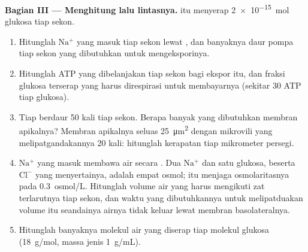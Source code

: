 \begin{problem}
\medskip
\noindent\textbf{Bagian III --- Menghitung lalu lintasnya.}
 itu menyerap \qty{2e-15}{mol} glukosa tiap sekon.
\begin{enumerate}[resume]
  \item Hitunglah $\mathrm{Na^+}$ yang masuk tiap sekon lewat
        , dan banyaknya daur pompa tiap sekon yang
        dibutuhkan untuk mengeksporinya.
  \item Hitunglah ATP yang dibelanjakan tiap sekon bagi ekspor itu, dan
        fraksi glukosa terserap yang harus direspirasi untuk
        membayarnya (sekitar 30 ATP tiap glukosa).
  \item Tiap  berdaur \qty{50}{} kali tiap sekon. Berapa
        banyak  yang dibutuhkan membran apikalnya? Membran
        apikalnya seluas \qty{25}{\micro m^2} dengan mikrovili yang
        melipatgandakannya \qty{20}{} kali: hitunglah kerapatan
         tiap mikrometer persegi.
  \item $\mathrm{Na^+}$ yang masuk membawa air secara . Dua
        $\mathrm{Na^+}$ dan satu glukosa, beserta $\mathrm{Cl^-}$ yang
        menyertainya, adalah empat osmol;  itu menjaga
        osmolaritasnya pada \qty{0.3}{osmol/L}. Hitunglah volume air
        yang harus mengikuti zat terlarutnya tiap sekon, dan waktu yang
        dibutuhkannya untuk melipatduakan volume  itu seandainya
        airnya tidak keluar lewat membran basolateralnya.
  \item Hitunglah banyaknya molekul air yang diserap tiap molekul
        glukosa (\qty{18}{g/mol}, massa jenis \qty{1}{g/mL}).
\end{enumerate}


\end{problem}
